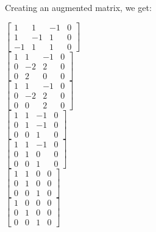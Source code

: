 \documentclass{report}
\begin{document}
Creating an augmented matrix, we get:

\begin{center}
    $\begin{bmatrix} 
        1 & 1 & -1 & 0\\ 
        1 & -1 & 1 & 0\\ 
        -1 & 1 & 1 & 0
    \end{bmatrix}$\\\vspace{3mm}
    $\begin{bmatrix} 
        1 & 1 & -1 & 0\\ 
        0 & -2 & 2 & 0\\ 
        0 & 2 & 0 & 0
    \end{bmatrix}$\\\vspace{3mm}
    $\begin{bmatrix} 
        1 & 1 & -1 & 0\\ 
        0 & -2 & 2 & 0\\ 
        0 & 0 & 2 & 0
    \end{bmatrix}$\\\vspace{3mm}
    $\begin{bmatrix} 
        1 & 1 & -1 & 0\\ 
        0 & 1 & -1 & 0\\ 
        0 & 0 & 1 & 0
    \end{bmatrix}$\\\vspace{3mm}
    $\begin{bmatrix} 
        1 & 1 & -1 & 0\\ 
        0 & 1 & 0 & 0\\ 
        0 & 0 & 1 & 0
    \end{bmatrix}$\\\vspace{3mm}
    $\begin{bmatrix} 
        1 & 1 & 0 & 0\\ 
        0 & 1 & 0 & 0\\ 
        0 & 0 & 1 & 0
    \end{bmatrix}$\\\vspace{3mm}
    $\begin{bmatrix} 
        1 & 0 & 0 & 0\\ 
        0 & 1 & 0 & 0\\ 
        0 & 0 & 1 & 0
    \end{bmatrix}$\\\vspace{3mm}

\end{center}
\end{document}
